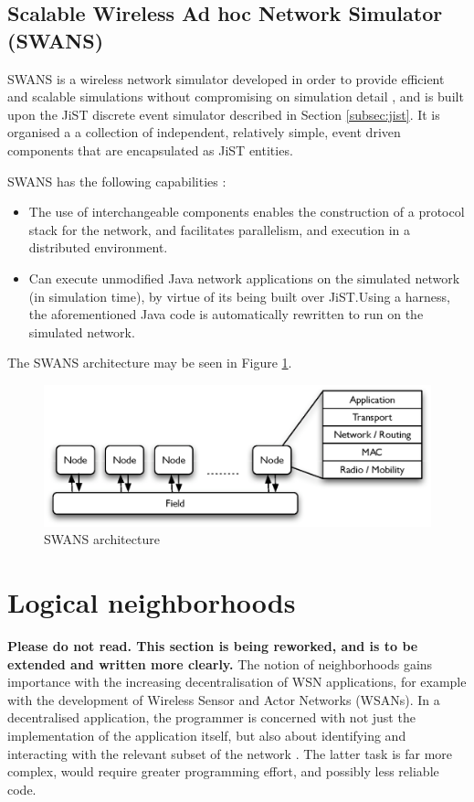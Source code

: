 \subsection{Scalable Wireless Ad hoc Network Simulator (SWANS)}
SWANS is a wireless network simulator developed in order to provide efficient
and scalable simulations without compromising on simulation detail \cite{barr_SWANS},
and is built upon the JiST discrete event simulator described in Section \ref{subsec:jist}. 
It is organised a a collection of independent, relatively simple, event driven
components that are encapsulated as JiST entities. 
  
SWANS has the following capabilities \cite{barr_SWANS}:

\begin{itemize}
\item The use of
interchangeable components enables the construction of a protocol stack for the
network, and facilitates parallelism, and execution in a distributed environment.
\item Can execute unmodified Java network applications on the
simulated network (in simulation time), by virtue of its being built over
JiST.Using a harness, the aforementioned Java code is automatically rewritten to
run on the simulated network.  
\end{itemize}
   
The SWANS architecture may be seen in Figure \ref{Fig:SWANS_architecture}. 

\begin{figure}[ht]
\centering
\label{Fig:SWANS_architecture}
\includegraphics[scale=0.71]{img/SWANS_architecture.eps} \caption[SWANS 
architecture]{SWANS architecture}
\end{figure} 

\section {Logical neighborhoods} \label{LNDescription}
\textbf{Please do not read. This section is being reworked, and is to be
extended and written more clearly.}
 The notion of
neighborhoods gains importance with the increasing 
decentralisation of WSN applications, for example with the development of 
Wireless Sensor and Actor Networks (WSANs). In a decentralised application, the 
programmer is concerned with not just the implementation of the application 
itself, but also about identifying and interacting with the relevant subset of 
the network \cite{mottola_LN:2006}. The latter task is far more complex, would 
require greater programming effort, and possibly less reliable code.

